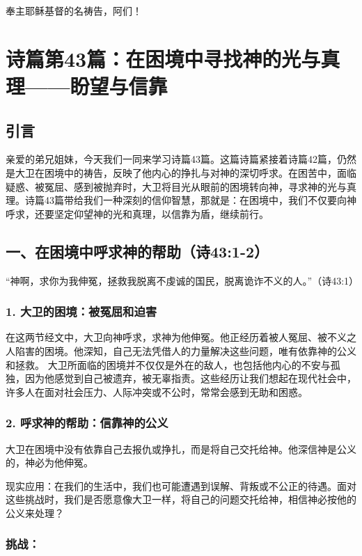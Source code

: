 \documentclass[a4paper, 12pt]{article}
\begin{document}
奉主耶稣基督的名祷告，阿们！

\newpage
\section{诗篇第43篇：在困境中寻找神的光与真理——盼望与信靠}
\subsection*{引言}
\hspace{0.6cm}亲爱的弟兄姐妹，今天我们一同来学习诗篇43篇。这篇诗篇紧接着诗篇42篇，仍然是大卫在困境中的祷告，反映了他内心的挣扎与对神的深切呼求。在困苦中，面临疑惑、被冤屈、感到被抛弃时，大卫将目光从眼前的困境转向神，寻求神的光与真理。诗篇43篇带给我们一种深刻的信仰智慧，那就是：在困境中，我们不仅要向神呼求，还要坚定仰望神的光和真理，以信靠为盾，继续前行。
\subsection*{一、在困境中呼求神的帮助（诗43:1-2）}
“神啊，求你为我伸冤，拯救我脱离不虔诚的国民，脱离诡诈不义的人。”（诗43:1）

\subsubsection*{1. 大卫的困境：被冤屈和迫害}
\hspace{0.6cm}在这两节经文中，大卫向神呼求，求神为他伸冤。他正经历着被人冤屈、被不义之人陷害的困境。他深知，自己无法凭借人的力量解决这些问题，唯有依靠神的公义和拯救。
大卫所面临的困境并不仅仅是外在的敌人，也包括他内心的不安与孤独，因为他感觉到自己被遗弃，被无辜指责。这些经历让我们想起在现代社会中，许多人在面对社会压力、人际冲突或不公时，常常会感到无助和困惑。
\subsubsection*{2. 呼求神的帮助：信靠神的公义}
\hspace{0.6cm}大卫在困境中没有依靠自己去报仇或挣扎，而是将自己交托给神。他深信神是公义的，神必为他伸冤。

现实应用：在我们的生活中，我们也可能遭遇到误解、背叛或不公正的待遇。面对这些挑战时，我们是否愿意像大卫一样，将自己的问题交托给神，相信神必按他的公义来处理？
\subsubsection*{挑战：}
\end{document}
